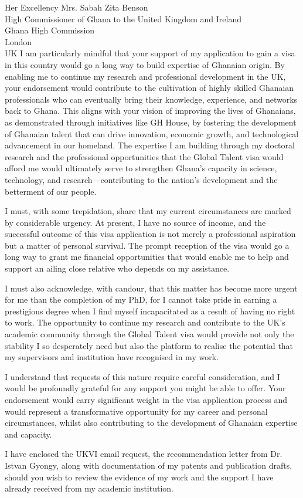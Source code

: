 \documentclass[12pt,a4paper]{letter}
\begin{document}
\begin{letter}{Her Excellency Mrs. Sabah Zita Benson\\High Commissioner of Ghana to the United Kingdom and Ireland\\Ghana High Commission\\London\\UK}
I am particularly mindful that your support of my application to gain a visa in this country would go a long way to build expertise of Ghanaian origin. By enabling me to continue my research and professional development in the UK, your endorsement would contribute to the cultivation of highly skilled Ghanaian professionals who can eventually bring their knowledge, experience, and networks back to Ghana. This aligns with your vision of improving the lives of Ghanaians, as demonstrated through initiatives like GH House, by fostering the development of Ghanaian talent that can drive innovation, economic growth, and technological advancement in our homeland. The expertise I am building through my doctoral research and the professional opportunities that the Global Talent visa would afford me would ultimately serve to strengthen Ghana's capacity in science, technology, and research—contributing to the nation's development and the betterment of our people.

I must, with some trepidation, share that my current circumstances are marked by considerable urgency. At present, I have no source of income, and the successful outcome of this visa application is not merely a professional aspiration but a matter of personal survival. The prompt reception of the visa would go a long way to grant me financial opportunities that would enable me to help and support an ailing close relative who depends on my assistance. 

I must also acknowledge, with candour, that this matter has become more urgent for me than the completion of my PhD, for I cannot take pride in earning a prestigious degree when I find myself incapacitated as a result of having no right to work. The opportunity to continue my research and contribute to the UK's academic community through the Global Talent visa would provide not only the stability I so desperately need but also the platform to realise the potential that my supervisors and institution have recognised in my work.

I understand that requests of this nature require careful consideration, and I would be profoundly grateful for any support you might be able to offer. Your endorsement would carry significant weight in the visa application process and would represent a transformative opportunity for my career and personal circumstances, whilst also contributing to the development of Ghanaian expertise and capacity.

I have enclosed the UKVI email request, the recommendation letter from Dr. Istvan Gyongy, along with documentation of my patents and publication drafts, should you wish to review the evidence of my work and the support I have already received from my academic institution.


\end{letter}
\end{document}
